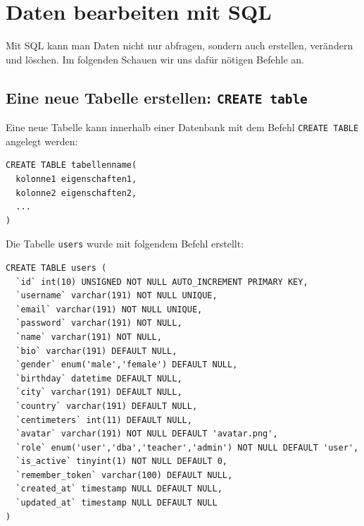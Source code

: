 \section{Daten bearbeiten mit \texorpdfstring{\gls{SQL}}{SQL}}
Mit SQL kann man Daten nicht nur abfragen, sondern auch erstellen, verändern und löschen. Im folgenden Schauen wir uns dafür nötigen Befehle an.

\subsection{Eine neue Tabelle erstellen: \texorpdfstring{\lstinline[style=sql]|CREATE table|}{CREATE table}}
\label{subsec:create-table}
Eine neue Tabelle kann innerhalb einer Datenbank mit dem Befehl \lstinline[style=sql]|CREATE TABLE| angelegt werden:

\begin{lstlisting}[style=sql]
CREATE TABLE tabellenname(
  kolonne1 eigenschaften1,
  kolonne2 eigenschaften2,
  ...
)
\end{lstlisting}

\begin{myexample}
\label{ex:sql-create}
Die Tabelle \texttt{users} wurde mit folgendem Befehl erstellt:

\begin{lstlisting}[style=sql]
CREATE TABLE users (
  `id` int(10) UNSIGNED NOT NULL AUTO_INCREMENT PRIMARY KEY,
  `username` varchar(191) NOT NULL UNIQUE,
  `email` varchar(191) NOT NULL UNIQUE,
  `password` varchar(191) NOT NULL,
  `name` varchar(191) NOT NULL,
  `bio` varchar(191) DEFAULT NULL,
  `gender` enum('male','female') DEFAULT NULL,
  `birthday` datetime DEFAULT NULL,
  `city` varchar(191) DEFAULT NULL,
  `country` varchar(191) DEFAULT NULL,
  `centimeters` int(11) DEFAULT NULL,
  `avatar` varchar(191) NOT NULL DEFAULT 'avatar.png',
  `role` enum('user','dba','teacher','admin') NOT NULL DEFAULT 'user',
  `is_active` tinyint(1) NOT NULL DEFAULT 0,
  `remember_token` varchar(100) DEFAULT NULL,
  `created_at` timestamp NULL DEFAULT NULL,
  `updated_at` timestamp NULL DEFAULT NULL
)
\end{lstlisting}
\end{myexample}

